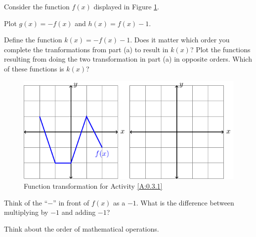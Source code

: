 \begin{activity}\label{A:0.3.1}
    Consider the function $f(x)$ displayed in Figure \ref{F:0.3.Act1}.
    \ba
        \item Plot $g(x) = -f(x)$ and $h(x) = f(x)-1$.
        \item Define the function $k(x) = -f(x)-1$.  Does it matter which order you
            complete the tranformations from part (a) to result in $k(x)$?  Plot the
            functions resulting from doing the two transformation in part (a) in opposite
            orders.  Which of these functions is $k(x)$?
    \ea
    \begin{figure}[h!]
        \begin{center}
            \includegraphics[width=0.65\columnwidth]{figures/0-3-fig2.pdf}
        \end{center}
        \caption{Function transformation for Activity \ref{A:0.3.1}} \label{F:0.3.Act1}
    \end{figure}
\end{activity}
\begin{smallhint}
    \ba
        \item Think of the ``$-$'' in front of $f(x)$ as a $-1$.  What is the difference
            between multiplying by $-1$ and adding $-1$?
        \item Think about the order of mathematical operations.
    \ea
\end{smallhint}
